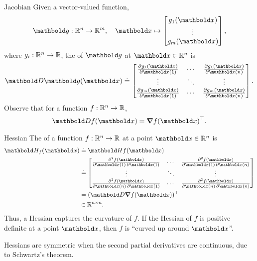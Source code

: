 \begin{marginbox}[-30\baselineskip]{Jacobian}
  Given a vector-valued function, \begin{align*}
    \vg : \R^n \to \R^m,\quad \vx \mapsto \begin{bmatrix}
      g_1(\vx) \\
      \vdots \\
      g_m(\vx) \\
   \end{bmatrix},
  \end{align*} where $g_i : \mathbb{R}^n \to \mathbb{R}$, the  of $\vg$ at $\vx \in \R^n$ is \begin{align}
    \jac{\vg(\vx)} \defeq \begin{bmatrix}
      \pdv{g_1(\vx)}{\vx(1)} & \cdots & \pdv{g_1(\vx)}{\vx(n)} \\
      \vdots & \ddots & \vdots \\
      \pdv{g_m(\vx)}{\vx(1)} & \cdots & \pdv{g_m(\vx)}{\vx(n)} \\
    \end{bmatrix}.
  \end{align}
  Observe that for a function $f : \mathbb{R}^n \to \mathbb{R}$, \begin{align}
    \jac f(\vx) = \transpose{\grad f(\vx)}.
  \end{align}
\end{marginbox}

\begin{marginbox}[-5\baselineskip]{Hessian}
  The  of a function $f : \mathbb{R}^n \to \mathbb{R}$ at a point $\vx \in \R^n$ is \begin{align}
    \hes_f(\vx) &\defeq \hes f(\vx) \nonumber \\
    &\defeq \begin{bmatrix}
      \pdv{f(\vx)}{\vx(1),\vx(1)} & \cdots & \pdv{f(\vx)}{\vx(1),\vx(n)} \\
      \vdots & \ddots & \vdots \\
      \pdv{f(\vx)}{\vx(n),\vx(1)} & \cdots & \pdv{f(\vx)}{\vx(n),\vx(n)} \\
   \end{bmatrix} \\
   &= \transpose{(\jac\grad f(\vx))} \label{eq:hessian} \\
   &\in \R^{n \times n}. \nonumber
  \end{align}
  Thus, a Hessian captures the curvature of $f$.
  If the Hessian of $f$ is positive definite at a point $\vx$, then $f$ is ``curved up around $\vx$''.

  Hessians are symmetric when the second partial derivatives are continuous, due to Schwartz's theorem.
\end{marginbox}

